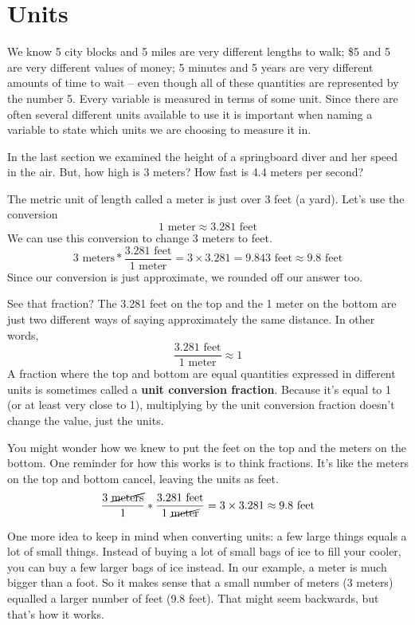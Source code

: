 
\section{Units}

We know 5 city blocks and 5 miles are very different lengths to walk; \$5 and 5\textcent \hspace{.01in} are very different values of money; 5 minutes and 5 years are very different amounts of time to wait -- even though all of these quantities are represented by the number 5. Every variable is measured in terms of some unit.  Since there are often several different units available to use it is important when naming a variable to state which units we are choosing to measure it in.  

In the last section we examined the height of a springboard diver and her speed in the air.  But, how high is 3 meters?  How fast is 4.4 meters per second?  

The metric unit of length called a meter is just over 3 feet (a yard).  Let's use the conversion 
$$1 \text{ meter} \approx 3.281 \text{ feet}$$  
We can use this conversion to change 3 meters to feet.
$$3 \text{ meters} \ast  \frac{3.281 \text{ feet}}{1 \text{ meter}} = 3 \times 3.281 = 9.843 \text{ feet} \approx 9.8 \text{ feet}$$  
Since our conversion is just approximate, we rounded off our answer too. 

See that fraction?  The 3.281 feet on the top and the 1 meter on the bottom are just two different ways of saying approximately the same distance. In other words, 
$$\frac{3.281 \text{ feet}}{1 \text{ meter}} \approx 1$$ 
 A fraction where the top and bottom are equal quantities expressed in different units is sometimes called a \textbf{unit conversion fraction}.  Because it's equal to 1 (or at least very close to 1), multiplying by the unit conversion fraction doesn't change the value, just the units.

You might wonder how we knew to put the feet on the top and the meters on the bottom.  One reminder for how this works is to think fractions.  It's like the meters on the top and bottom cancel, leaving the units as feet.  
$$\frac{3 \text{ \cancel{meters}}}{1} \ast  \frac{3.281 \text{ feet}}{1 \text{ \cancel{meter}}} = 3 \times 3.281 \approx 9.8 \text{ feet}$$

One more idea to keep in mind when converting units:  a few large things equals a lot of small things.  
Instead of buying a lot of small bags of ice to fill your cooler, you can buy a few larger  bags of ice instead.
In our example, a meter is much bigger than a foot.  So it makes sense that a small number of meters (3 meters) equalled a larger number of feet (9.8 feet).  That might seem backwards, but that's how it works.  

